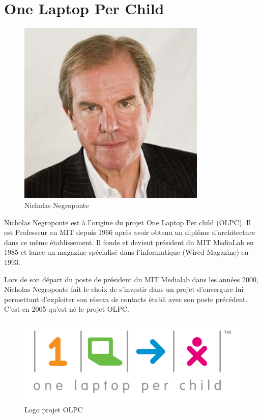 \section{One Laptop Per Child}

\begin{minipage}[H]{0.3\linewidth}
  \begin{figure}[H]
  \centering
  \includegraphics[width=0.8\textwidth]{../resources/illustrations/nicholasnegroponte}
  \caption{\mbox{Nicholas} \mbox{Negroponte}}
  \end{figure}
\end{minipage}
\begin{minipage}[H]{0.7\linewidth}
Nicholas Negroponte est à l'origine du projet \og One Laptop Per child \fg{} (\gls{OLPC}). Il est Professeur au MIT depuis 1966 après avoir obtenu un diplôme d'architecture dans ce même établissement. Il fonde et devient président du MIT MediaLab en 1985 et lance un magazine spécialisé dans l'informatique (Wired Magazine) en 1993\cite{wikipedia_nicholas_negroponte}.
\vspace{.8cm}
\end{minipage}

Lors de son départ du poste de président du MIT Medialab dans les années 2000, Nicholas Negroponte fait le choix de s'investir dans un projet d'envergure lui permettant d'exploiter son réseau de contacts établi avec son poste précédent. C'est en 2005 qu'est né le projet \gls{OLPC}.

\begin{figure}[H]
  \centering
  \includegraphics[width=.5\textwidth]{../resources/illustrations/OLPC_logo}
  \caption{Logo projet \gls{OLPC}}
\end{figure}

